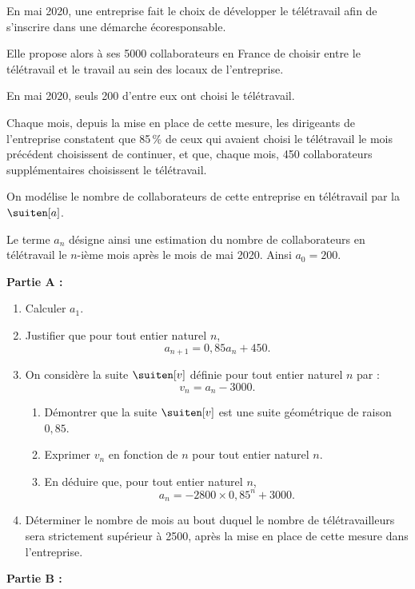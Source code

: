 En mai 2020, une entreprise fait le choix de développer le télétravail afin de s’inscrire
dans une démarche écoresponsable.

Elle propose alors à ses \num{5000} collaborateurs en France de choisir entre le télétravail et le travail au sein des locaux de l’entreprise.

En mai 2020, seuls 200 d’entre eux ont choisi le télétravail.

Chaque mois, depuis la mise en place de cette mesure, les dirigeants de l’entreprise constatent que 85\,\% de ceux qui avaient choisi le télétravail le mois précédent choisissent de continuer, et que, chaque mois, 450 collaborateurs supplémentaires choisissent le télétravail.

\smallskip

On modélise le nombre de collaborateurs de cette entreprise en télétravail par la $\suiten[a]$.

\smallskip

Le terme $a_n$ désigne ainsi une estimation du nombre de collaborateurs en télétravail
le $n$-ième mois après le mois de mai 2020. Ainsi $a_0 = 200$.

\medskip

\textbf{Partie A :}

\begin{enumerate}
	\item Calculer $a_1$.
	\item Justifier que pour tout entier naturel $n$, \[ a_{n+1}=0,85a_n+450. \]
	\item On considère la suite $\suiten[v]$ définie pour tout entier naturel $n$ par : \[ v_n = a_n - \num{3000}. \]
	\begin{enumerate}
		\item Démontrer que la suite $\suiten[v]$ est une suite géométrique de raison $0,85$.
		\item Exprimer $v_n$ en fonction de $n$ pour tout entier naturel $n$.
		\item En déduire que, pour tout entier naturel $n$, \[ a_n = -\num{2800} \times 0,85^n + \num{3000}. \]
	\end{enumerate}
	\item  Déterminer le nombre de mois au bout duquel le nombre de télétravailleurs sera strictement supérieur à \num{2500}, après la mise en place de cette mesure dans l’entreprise.
\end{enumerate}

\smallskip

\textbf{Partie B :}

